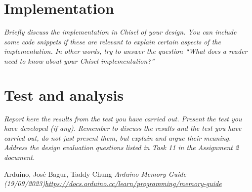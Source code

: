 \documentclass[a4paper, english]{article}
\numberwithin{equation}{section}
\begin{document}
\section{Implementation}
\emph{Briefly discuss the implementation in Chisel of your design. You can include some code snippets if these are relevant to explain certain aspects of the implementation. In other words, try to answer the question “What does a reader need to know about your Chisel implementation?”}
\section{Test and analysis}
\emph{Report here the results from the test you have carried out. Present the test you have developed (if any). Remember to discuss the results and the test you have carried out, do not just present them, but explain and argue their meaning. Address the design evaluation questions listed in Task 11 in the Assignment 2 document.}
\begin{thebibliography}{1}
    Arduino, José Bagur, Taddy Chung \emph{Arduino Memory Guide (19/09/2023)\newline \href{https://docs.arduino.cc/learn/programming/memory-guide}{https://docs.arduino.cc/learn/programming/memory-guide}}
\end{thebibliography}

%
%




%
\end{document}
